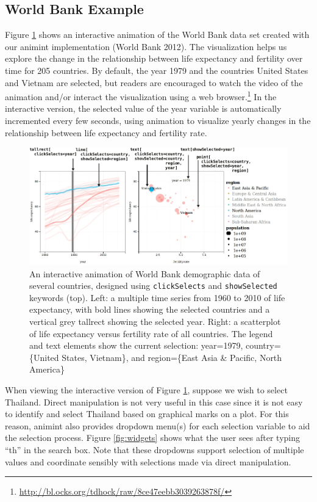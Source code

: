 \documentclass[12pt,]{article}
\let\rmarkdownfootnote\footnote%
\def\footnote{\protect\rmarkdownfootnote}
\theoremstyle{definition}
\theoremstyle{definition}
\theoremstyle{remark}
\begin{document}
\subsection{World Bank Example}\label{worldbank}

Figure \ref{fig:worldbank} shows an interactive animation of the World
Bank data set created with our animint implementation (World Bank 2012).
The visualization helps us explore the change in the relationship
between life expectancy and fertility over time for 205 countries. By
default, the year 1979 and the countries United States and Vietnam are
selected, but readers are encouraged to watch the video of the animation
and/or interact the visualization using a web
browser.\footnote{\url{http://bl.ocks.org/tdhock/raw/8ce47eebb3039263878f/}}
In the interactive version, the selected value of the year variable is
automatically incremented every few seconds, using animation to
visualize yearly changes in the relationship between life expectancy and
fertility rate.

\begin{figure}
\centering
\includegraphics{images/figure-1.pdf}
\caption{\label{fig:worldbank}An interactive animation of World Bank
demographic data of several countries, designed using
\texttt{clickSelects} and \texttt{showSelected} keywords (top). Left: a
multiple time series from 1960 to 2010 of life expectancy, with bold
lines showing the selected countries and a vertical grey tallrect
showing the selected year. Right: a scatterplot of life expectancy
versus fertility rate of all countries. The legend and text elements
show the current selection: year=1979, country=\{United States,
Vietnam\}, and region=\{East Asia \& Pacific, North America\}}
\end{figure}

When viewing the interactive version of Figure \ref{fig:worldbank},
suppose we wish to select Thailand. Direct manipulation is not very
useful in this case since it is not easy to identify and select Thailand
based on graphical marks on a plot. For this reason, animint also
provides dropdown menu(s) for each selection variable to aid the
selection process. Figure \ref{fig:widgets} shows what the user sees
after typing ``th'' in the search box. Note that these dropdowns support
selection of multiple values and coordinate sensibly with selections
made via direct manipulation.
\end{document}
